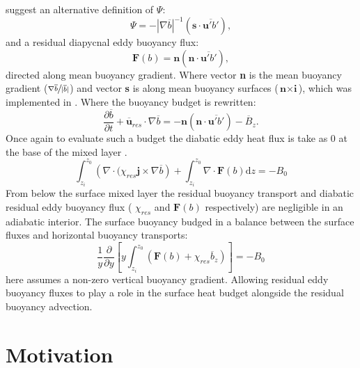 \citet{Plumb2005} suggest an alternative definition of $\Psi$:
\begin{equation}
\Psi = - |\nabla \overline{b}|^{-1} (\textbf{s}\cdot\overline{\textbf{u}'b'}),
\label{eq:PF05psi}
\end{equation}
and a residual diapycnal eddy buoyancy flux:
\begin{equation}
\textbf{F}(b) = \textbf{n}(\textbf{n}\cdot\overline{\textbf{u}'b'}),
\end{equation}
directed along mean buoyancy gradient. Where vector \textbf{n} is the mean buoyancy gradient ($\displaystyle{\sfrac{\nabla \overline{b}}{|\overline{b}|}}$) and vector \textbf{s} is along mean buoyancy surfaces ($\displaystyle{\textbf{n}\times \textbf{i} }$), which was implemented in \citet{kuo2005}. Where the buoyancy budget is rewritten:
\begin{equation}
\frac{\partial \overline{b}}{\partial t} + \overline{\textbf{u}}_{res} \cdot \nabla \overline{b} = - \textbf{n}(\textbf{n}\cdot\overline{\textbf{u}'b'}) - \overline{B}_z .
\label{eq:kuobb}
\end{equation}
Once again to evaluate such a budget the diabatic eddy heat flux is take as 0 at the base of the mixed layer .
 \begin{equation}
\int _{z_i}^{z_0} \left( \nabla \cdot (\chi _{res} \textbf{j} \times \nabla \overline{b} \right) + \int _{z_i}^{z_0} \nabla \cdot \textbf{F}(b) \mathrm{d}z = - B_0
\label{eq:kuobb1}
\end{equation}
From below the surface mixed layer the residual buoyancy transport and diabatic residual eddy buoyancy flux ( $\chi _{res}$ and $\textbf{F}(b)$ respectively) are negligible in an adiabatic interior. The surface buoyancy budged in a balance between the surface fluxes and horizontal buoyancy transports:
\begin{equation}
\frac{1}{y}\frac{\partial}{\partial y} \left[ y \int_{z_i}^{z_0} \left( \textbf{F}(b) + \chi_{res} \overline{b}_z \right) \right] = - B_0
\end{equation}
here \citet{kuo2005} assumes a non-zero vertical buoyancy gradient. Allowing residual eddy buoyancy fluxes to play a role in the surface heat budget alongside the residual buoyancy advection. 

\section{Motivation}

